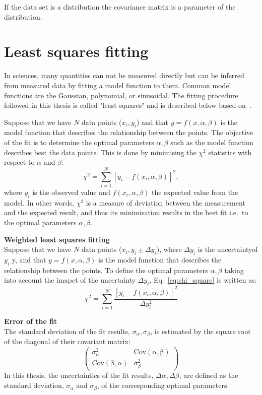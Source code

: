 If the data set is a distribution the covariance matrix is a parameter of the distribution.


\section{Least squares fitting}\label{app:non_linear_fitting}
In sciences, many quantities can not be measured directly but can be inferred from measured data by fitting a model function to them. Common model functions are the Gaussian, polynomial, or sinusoidal. The fitting procedure followed in this thesis is called "least squares" and is described below based on~\cite{least_square_minimisation}.

Suppose that we have $N$ data points ($x_{i}, y_{i}$) and that $y=f(x,\alpha, \beta)$ is the model function that describes the relationship between the points. The objective of the fit is to determine the optimal parameters $\alpha, \beta$ such as the model function describes best the data points. This is done by minimising the $\chi^2$ statistics with respect to $\alpha$ and $\beta$:
\begin{equation}\label{eq:chi_square}
    \chi^2 = \sum_{i=1}^{N}[y_{i}-f(x_{i},\alpha, \beta)]^2,
\end{equation}
where $y_{i}$ is the observed value and $f(x_{i},\alpha, \beta)$ the expected value from the model. In other words, $\chi^2$ is a measure of deviation between the measurement and the expected result, and thus its minimisation results in the best fit i.e.\ to the optimal parameters $\alpha, \beta$.

\normalsize{\textbf{Weighted least squares fitting}}\\
Suppose that we have $N$ data points ($x_i, y_i \pm \Delta y_i $), where $ \Delta y_i$ is the uncertaintyof $y_i$ y, and that $y=f(x,\alpha, \beta)$ is the model function that describes the relationship between the points. To define the optimal parameters $\alpha, \beta$ taking into account the imapct of the uncertainty $\Delta y_i$, Eq.~\eqref{eq:chi_square} is written as:
\begin{equation}\label{eq:chi_square_weights}
    \chi^2 = \sum_{i=1}^{N}\frac{[y_{i}-f(x_{i},\alpha, \beta)]^2}{\Delta y_i^2}
\end{equation}

\normalsize{\textbf{Error of the fit}}\\
The standard deviation of the fit results, $\sigma_\alpha, \sigma_\beta$, is estimated by the square root of the diagonal of their covariant matrix:
\begin{equation}\label{eq:cov_matrix_fit_results}
    \begin{pmatrix}
        \sigma_{\alpha}^2 & \mathrm{Cov(\alpha, \beta)}\\
        \mathrm{Cov(\beta, \alpha)} & \sigma_{\beta}^2
        \end{pmatrix}
\end{equation}
In this thesis, the uncertainties of the fit results, $\Delta \alpha, \Delta \beta$, are defined as the standard deviation, $\sigma_{\alpha}$ and  $\sigma_{\beta}$, of the corresponding optimal parameters.

